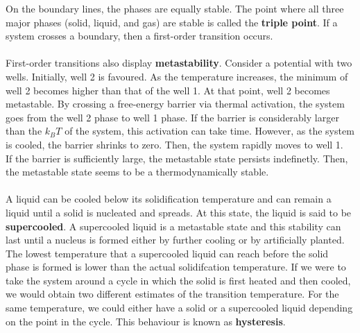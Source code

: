         On the boundary lines, the phases are equally stable. The point where all three major phases (solid, liquid, and gas) are stable is called the \textbf{triple point}. If a system crosses a boundary, then a first-order transition occurs. \\
        \\
        First-order transitions also display \textbf{metastability}. Consider a potential with two wells. Initially, well 2 is favoured. As the temperature increases, the minimum of well 2 becomes higher than that of the well 1. At that point, well 2 becomes metastable. By crossing a free-energy barrier via thermal activation, the system goes from the well 2 phase to well 1 phase. If the barrier is considerably larger than the $k_BT$ of the system, this activation can take time. However, as the system is cooled, the barrier shrinks to zero. Then, the system rapidly moves to well 1. \\
        If the barrier is sufficiently large, the metastable state persists indefinetly. Then, the metastable state seems to be a thermodynamically stable.  \\
        \\
        A liquid can be cooled below its solidification temperature and can remain a liquid until a solid is nucleated and spreads. At this state, the liquid is said to be \textbf{supercooled}. A supercooled liquid is a metastable state and this stability can last until a nucleus is formed either by further cooling or by artificially planted. \\
        The lowest temperature that a supercooled liquid can reach before the solid phase is formed is lower than the actual solidifcation temperature. If we were to take the system around a cycle in which the solid is first heated and then cooled, we would obtain two different estimates of the transition temperature. For the same temperature, we could either have a solid or a supercooled liquid depending on the point in the cycle. This behaviour is known as \textbf{hysteresis}.

